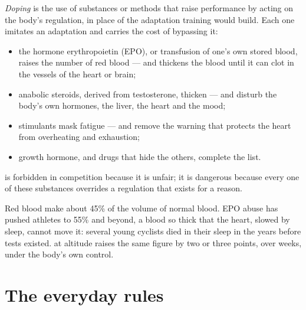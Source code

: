 \begin{proposition}[Doping]\label{prop:g10:sport-and-health:doping}
\emph{Doping} is the use of substances or methods that
raise performance by acting on the body's regulation, in place of the
adaptation training would build. Each one imitates an adaptation and
carries the cost of bypassing it:
\begin{itemize}
  \item the hormone erythropoietin (EPO), or transfusion of one's own
        stored blood, raises the number of red blood  --- and
        thickens the blood until it can clot in the vessels of the
        heart or brain;
  \item anabolic steroids, derived from testosterone, thicken  --- and disturb the body's own hormones, the liver, the
        heart and the mood;
  \item stimulants mask fatigue --- and remove the warning that
        protects the heart from overheating and exhaustion;
  \item growth hormone, and drugs that hide the others, complete the
        list.
\end{itemize}
 is forbidden in competition because it is unfair; it is
dangerous because every one of these substances overrides a
regulation that exists for a reason.
\end{proposition}
\admitted

\begin{example}\label{ex:g10:sport-and-health:epo}
Red blood  make about 45\% of the volume of normal blood. EPO
abuse has pushed athletes to 55\% and beyond, a blood so thick that
the heart, slowed by sleep, cannot move it: several young cyclists
died in their sleep in the years before tests existed.  at
altitude raises the same figure by two or three points, over weeks,
under the body's own control.
\end{example}

\section{The everyday rules}

